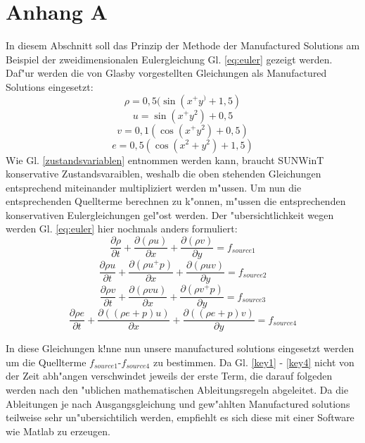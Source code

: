 \newpage
\chapter*{Anhang A}
In diesem Abschnitt soll das Prinzip der Methode der Manufactured Solutions am Beispiel der zweidimensionalen Eulergleichung Gl. \ref{eq:euler} gezeigt werden. Daf"ur werden die von Glasby \cite{glasby2013comparison} vorgestellten Gleichungen als Manufactured Solutions eingesetzt:
\begin{equation}\label{key1}
	\rho = 0,5 (\sin(x^+y^)+1,5)
\end{equation}
\begin{equation}\label{key2}
	u = \sin(x^+y^2)+0,5
\end{equation}
\begin{equation}\label{key3}
	v = 0,1(\cos(x^+y^2)+0,5)
\end{equation}
\begin{equation}\label{key4}
	e = 0,5(\cos(x^2+y^2)+1,5)
\end{equation}
Wie Gl. \ref{zustandsvariablen} entnommen werden kann, braucht SUNWinT konservative Zustandsvaraiblen, weshalb die oben stehenden Gleichungen entsprechend miteinander multipliziert werden m"ussen.
Um nun die entsprechenden Quellterme berechnen zu k"onnen, m"ussen die entsprechenden konservativen Eulergleichungen gel"ost werden. Der "ubersichtlichkeit wegen werden Gl. \ref{eq:euler} hier nochmals anders formuliert:
\begin{equation}\label{eq:firstSource}
	\frac{\partial \rho}{\partial t}+\frac{\partial(\rho u)}{\partial x} + \frac{\partial (\rho v)}{\partial y} = f_{source1}
\end{equation}
\begin{equation}\label{eq:secondSource}
	\frac{\partial \rho u}{\partial t}+\frac{\partial(\rho u^+p)}{\partial x} + \frac{\partial (\rho u v)}{\partial y} = f_{source2}
\end{equation}
\begin{equation}\label{eq:thirdSource}
\frac{\partial \rho v}{\partial t} + \frac{\partial (\rho v u)}{\partial x} + \frac{\partial(\rho v^+p)}{\partial y} = f_{source3}
\end{equation}
\begin{equation}\label{eq:fourthSource}
\frac{\partial \rho e}{\partial t} + \frac{\partial ((\rho e+p)u)}{\partial x} +\frac{\partial ((\rho e+p)v)}{\partial y} = f_{source4}
\end{equation}

In diese Gleichungen k!nne nun unsere manufactured solutions eingesetzt werden um die Quellterme $f_{source1}$-$f_{source4}$ zu bestimmen. Da Gl. \ref{key1} - \ref{key4} nicht von der Zeit abh"angen verschwindet jeweils der erste Term, die darauf folgeden werden nach den "ublichen mathematischen Ableitungsregeln abgeleitet. Da die Ableitungen je nach Ausgangsgleichung und gew"ahlten Manufactured solutions teilweise sehr un"ubersichtilich werden, empfiehlt es sich diese mit einer Software wie Matlab zu erzeugen. 
